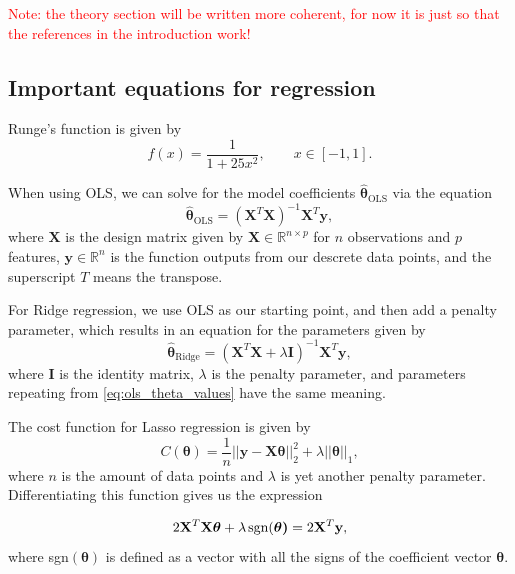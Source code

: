 \textcolor{red}{Note: the theory section will be written more coherent, for now it is just so that the references in the introduction work!}

\subsection{Important equations for regression}
Runge's function is given by
\begin{equation}\label{eq:runges_function}
    f(x) = \frac{1}{1+25x^2}, \qquad x \in [-1, 1].
\end{equation}

When using OLS, we can solve for the model coefficients $\boldsymbol{\hat{\theta}_{\mathrm{OLS}}}$ via the equation 
\begin{equation}\label{eq:ols_theta_values}
    \boldsymbol{\hat{\theta}}_{\mathrm{OLS}} = (\mathbf{X}^{T}\mathbf{X})^{-1}\mathbf{X}^{T}\mathbf{y},
\end{equation}
where $\mathbf{X}$ is the design matrix given by $\boldsymbol{X}\in\mathbb{R}^{n\times p}$ for $n$ observations and $p$ features, $\mathbf{y} \in \mathbb{R}^{n}$ is the function outputs from our descrete data points, and the superscript $T$ means the transpose.

For Ridge regression, we use OLS as our starting point, and then add a penalty parameter, which results in an equation for the parameters given by
\begin{equation}\label{eq:ridge_theta_values}
    \boldsymbol{\hat{\theta}}_{\mathrm{Ridge}} = (\mathbf{X}^{T}\mathbf{X} + \lambda\mathbf{I})^{-1}\mathbf{X}^{T}\mathbf{y},
\end{equation}
where $\mathbf{I}$ is the identity matrix, $\lambda$ is the penalty parameter, and parameters repeating from \autoref{eq:ols_theta_values} have the same meaning.

The cost function for Lasso regression is given by
\begin{equation}\label{eq:lasso_cost_function}
    C(\boldsymbol{\theta}) = \frac{1}{n}||\mathbf{y}-\mathbf{X}\boldsymbol{\theta}||_2^2+\lambda||\boldsymbol{\theta}||_1,
\end{equation}
where $n$ is the amount of data points and $\lambda$ is yet another penalty parameter. Differentiating this function gives us the expression

\begin{equation}\label{eq:lasso_optimise}
   2\mathbf{X}^T\mathbf{X}\boldsymbol{\theta}+\lambda\hspace{0.5mm}\text{sgn}(\boldsymbol{\theta)}=2\mathbf{X}^T\mathbf{y},
\end{equation}
where sgn$(\boldsymbol{\theta})$ is defined as a vector with all the signs of the coefficient vector $\boldsymbol{\theta}$. 


